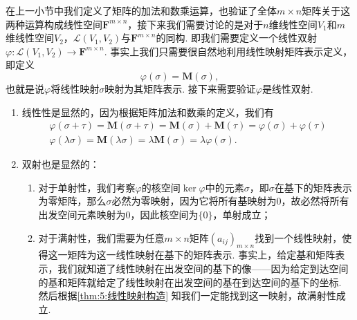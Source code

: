 在上一小节中我们定义了矩阵的加法和数乘运算，也验证了全体$m\times n$矩阵关于这两种运算构成线性空间$\mathbf{F}^{m\times n}$，接下来我们需要讨论的是对于$n$维线性空间$V_1$和$m$维线性空间$V_2$，$\mathcal{L}(V_1,V_2)$与$\mathbf{F}^{m\times n}$的同构. 即我们需要定义一个线性双射$\varphi:\mathcal{L}(V_1,V_2)\to\mathbf{F}^{m\times n}$. 事实上我们只需要很自然地利用线性映射矩阵表示定义，即定义
\[\varphi(\sigma)=\mathbf{M}(\sigma),\]
也就是说$\varphi$将线性映射$\sigma$映射为其矩阵表示. 接下来需要验证$\varphi$是线性双射.
\begin{enumerate}
    \item 线性性是显然的，因为根据矩阵加法和数乘的定义，我们有
          \begin{gather*}
              \varphi(\sigma+\tau)=\mathbf{M}(\sigma+\tau)=\mathbf{M}(\sigma)+\mathbf{M}(\tau)=\varphi(\sigma)+\varphi(\tau) \\
              \varphi(\lambda\sigma)=\mathbf{M}(\lambda\sigma)=\lambda\mathbf{M}(\sigma)=\lambda\varphi(\sigma).
          \end{gather*}

    \item 双射也是显然的：
          \begin{enumerate}
              \item 对于单射性，我们考察$\varphi$的核空间$\ker\varphi$中的元素$\sigma$，即$\sigma$在基下的矩阵表示为零矩阵，那么$\sigma$必然为零映射，因为它将所有基映射为0，故必然将所有出发空间元素映射为0，因此核空间为$\{0\}$，单射成立；

              \item 对于满射性，我们需要为任意$m\times n$矩阵$(a_{ij})_{m\times n}$找到一个线性映射，使得这一矩阵为这一线性映射在基下的矩阵表示. 事实上，给定基和矩阵表示，我们就知道了线性映射在出发空间的基下的像——因为给定到达空间的基和矩阵就给定了线性映射在出发空间的基在到达空间的基下的坐标. 然后根据\autoref{thm:5:线性映射构造} 知我们一定能找到这一映射，故满射性成立.
          \end{enumerate}
\end{enumerate}

